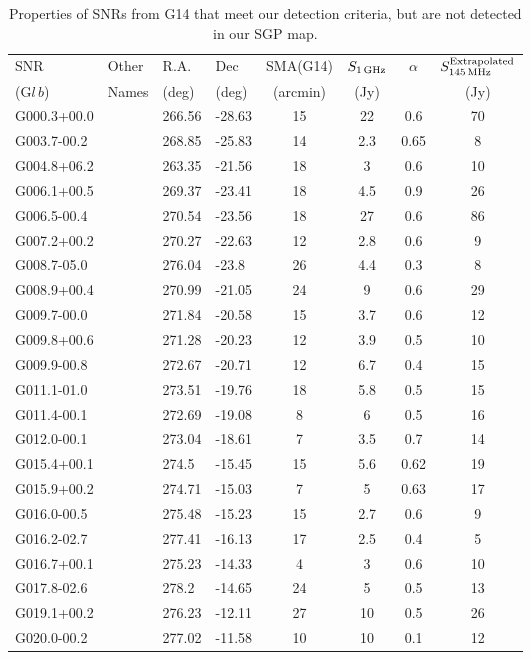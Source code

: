 \documentclass[useAMS,usenatbib]{mn2e}
\begin{document}
\begin{table}
\caption{Properties of SNRs from G14 that meet our detection criteria, but are not detected in our SGP map.}
\begin{tabular}{llllcccc}
\hline
SNR	&	Other	&	R.A.	&	Dec	&	SMA(G14)	&	$S_{1\,{\rm GHz}}$ &	$\alpha$ 	&	$S^{\rm Extrapolated}_{145\,{\rm MHz}}$			\\
(G$l\,b$)	&	Names	&	(deg)	&	(deg)	&	(arcmin)	&	(Jy)	&			&	(Jy)			\\
\hline
G000.3+00.0	&		&	266.56	&	-28.63	&	15	&	22	&	0.6	&	70	\\
G003.7-00.2	&		&	268.85	&	-25.83	&	14	&	2.3	&	0.65	&	8	\\
G004.8+06.2	&		&	263.35	&	-21.56	&	18	&	3	&	0.6	&	10	\\
G006.1+00.5	&		&	269.37	&	-23.41	&	18	&	4.5	&	0.9	&	26	\\
G006.5-00.4	&		&	270.54	&	-23.56	&	18	&	27	&	0.6	&	86	\\
G007.2+00.2	&		&	270.27	&	-22.63	&	12	&	2.8	&	0.6	&	9	\\
G008.7-05.0	&		&	276.04	&	-23.8	&	26	&	4.4	&	0.3	&	8	\\
G008.9+00.4	&		&	270.99	&	-21.05	&	24	&	9	&	0.6	&	29	\\
G009.7-00.0	&		&	271.84	&	-20.58	&	15	&	3.7	&	0.6	&	12	\\
G009.8+00.6	&		&	271.28	&	-20.23	&	12	&	3.9	&	0.5	&	10	\\
G009.9-00.8	&		&	272.67	&	-20.71	&	12	&	6.7	&	0.4	&	15	\\
G011.1-01.0	&		&	273.51	&	-19.76	&	18	&	5.8	&	0.5	&	15	\\
G011.4-00.1	&		&	272.69	&	-19.08	&	8	&	6	&	0.5	&	16	\\
G012.0-00.1	&		&	273.04	&	-18.61	&	7	&	3.5	&	0.7	&	14	\\
G015.4+00.1	&		&	274.5	&	-15.45	&	15	&	5.6	&	0.62	&	19	\\
G015.9+00.2	&		&	274.71	&	-15.03	&	7	&	5	&	0.63	&	17	\\
G016.0-00.5	&		&	275.48	&	-15.23	&	15	&	2.7	&	0.6	&	9	\\
G016.2-02.7	&		&	277.41	&	-16.13	&	17	&	2.5	&	0.4	&	5	\\
G016.7+00.1	&		&	275.23	&	-14.33	&	4	&	3	&	0.6	&	10	\\
G017.8-02.6	&		&	278.2	&	-14.65	&	24	&	5	&	0.5	&	13	\\
G019.1+00.2	&		&	276.23	&	-12.11	&	27	&	10	&	0.5	&	26	\\
G020.0-00.2	&		&	277.02	&	-11.58	&	10	&	10	&	0.1	&	12	\\

\end{tabular}
\end{table}
\end{document}

